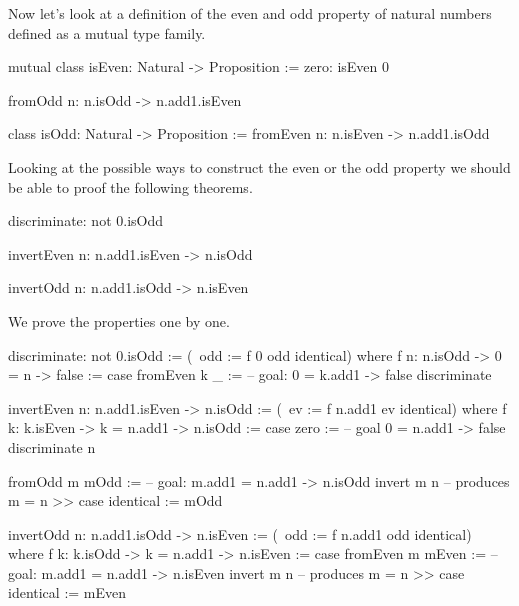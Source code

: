 \vskip 5mm
Now let's look at a definition of the even and odd property of natural numbers
defined as a mutual type family.
%
\begin{alba}
    mutual
        class
            isEven: Natural -> Proposition
        :=
            zero: isEven 0

            fromOdd n: n.isOdd -> n.add1.isEven

        class
            isOdd: Natural -> Proposition
        :=
            fromEven n: n.isEven -> n.add1.isOdd
\end{alba}
%
Looking at the possible ways to construct the even or the odd property we should
be able to proof the following theorems.
%
\begin{alba}
    discriminate: not 0.isOdd

    invertEven n: n.add1.isEven -> n.isOdd

    invertOdd  n: n.add1.isOdd  -> n.isEven
\end{alba}


\noindent We prove the properties one by one.

\begin{alba}
    discriminate: not 0.isOdd :=
        (\ odd := f 0 odd identical)
        where
        f n: n.isOdd -> 0 = n -> false
        :=
            case
                fromEven k _ :=
                    -- goal: 0 = k.add1 -> false
                    discriminate

    invertEven n: n.add1.isEven -> n.isOdd
    :=
        (\ ev := f n.add1 ev identical)
        where
        f k: k.isEven -> k = n.add1 -> n.isOdd
        :=
            case
                zero :=
                    -- goal 0 = n.add1 -> false
                    discriminate n

                fromOdd m mOdd :=
                    -- goal: m.add1 = n.add1 -> n.isOdd
                    invert m n -- produces m = n
                    >>
                    case
                        identical := mOdd

    invertOdd n: n.add1.isOdd -> n.isEven
    :=
        (\ odd := f n.add1 odd identical)
        where
        f k: k.isOdd -> k = n.add1 -> n.isEven
        :=
            case
                fromEven m mEven :=
                    -- goal: m.add1 = n.add1 -> n.isEven
                    invert m n -- produces m = n
                    >>
                    case
                        identical := mEven
\end{alba}

